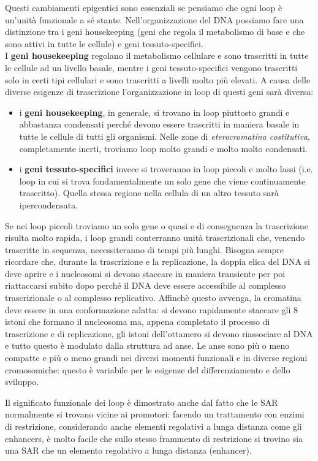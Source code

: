 \documentclass[11pt]{book}
\begin{document}
Questi cambiamenti epigentici sono essenziali se pensiamo che ogni loop è un'unità funzionale a sé stante. Nell'organizzazione del DNA possiamo fare una distinzione tra i geni housekeeping (geni che regola il metabolismo di base e che sono attivi in tutte le cellule) e geni tessuto-specifici.\\
I \textbf{geni housekeeping} regolano il metabolismo cellulare e sono trascritti in tutte le cellule ad un livello basale, mentre i geni tessuto-specifici vengono trascritti solo in certi tipi cellulari e sono trascritti a livelli molto più elevati.
A causa delle diverse esigenze di trascrizione l'organizzazione in loop di questi geni sarà diversa:
\begin{itemize}
\item i \textbf{geni housekeeping}, in generale, si trovano in loop piuttosto grandi e abbastanza condensati perché devono essere trascritti in maniera basale in tutte le cellule di tutti gli organismi. Nelle zone di \emph{eterocromatina costitutiva}, completamente inerti, troviamo loop molto grandi e molto molto condensati.
\item i \textbf{geni tessuto-specifici} invece si troveranno in loop piccoli e molto lassi (i.e. loop in cui si trova fondamentalmente un solo gene che viene continuamente trascritto). Quella stessa regione nella cellula di un altro tessuto sarà ipercondensata.
\end{itemize}

Se nei loop piccoli troviamo un solo gene o quasi e di conseguenza la trascrizione risulta molto rapida, i loop grandi conterranno unità trascrizionali che, venendo trascritte in sequenza, necessiteranno di tempi più lunghi.
Bisogna sempre ricordare che, durante la trascrizione e la replicazione, la doppia elica del DNA si deve aprire e i nucleosomi si devono staccare in maniera transiente per poi riattaccarsi subito dopo perché il DNA deve essere accessibile al complesso trascrizionale o al complesso replicativo. Affinchè questo avvenga, la cromatina deve essere in una conformazione adatta: si devono rapidamente staccare gli 8 istoni che formano il nucleosoma ma, appena completato il processo di trascrizione e di replicazione, gli istoni dell’ottamero si devono riassociare al DNA e tutto questo è modulato dalla struttura ad anse.
Le anse sono più o meno compatte e più o meno grandi nei diversi momenti funzionali e in diverse regioni cromosomiche: questo è variabile per le esigenze del differenziamento e dello sviluppo.

Il significato funzionale dei loop è dimostrato anche dal fatto che le SAR normalmente si trovano vicine ai promotori: facendo un trattamento con enzimi di restrizione, considerando anche elementi regolativi a lunga distanza come gli enhancers, è molto facile che sullo stesso frammento di restrizione si trovino sia una SAR che un elemento regolativo a lunga distanza (enhancer).
\end{document}
